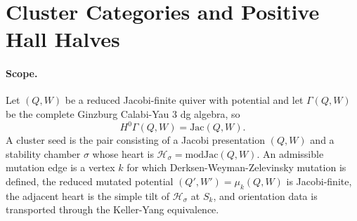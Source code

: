 
\providecommand{\Hom}{\mathrm{Hom}}
\providecommand{\End}{\mathrm{End}}
\providecommand{\Ext}{\mathrm{Ext}}
\providecommand{\per}{\mathrm{per}}
\providecommand{\CoHA}{\mathrm{CoHA}}
\providecommand{\Jac}{\mathrm{Jac}}
\providecommand{\Rep}{\mathrm{Rep}}
\providecommand{\mod}{\mathrm{mod}}
\providecommand{\fd}{\mathrm{fd}}
\providecommand{\sC}{\mathcal{C}}
\providecommand{\sD}{\mathcal{D}}
\providecommand{\sH}{\mathcal{H}}
\providecommand{\bC}{\mathbb{C}}
\providecommand{\bZ}{\mathbb{Z}}
\providecommand{\bP}{\mathbb{P}}
\providecommand{\Yplus}{Y^{+}}
\providecommand{\kch}{\kappa_{\mathrm{ch}}}
\providecommand{\kcat}{\kappa_{\mathrm{cat}}}
\providecommand{\chiHall}{\chi^{\mathrm{Hall}}}

\section*{Cluster Categories and Positive Hall Halves}
\label{sec:cluster-Yplus-gluing}

\paragraph{Scope.}
Let $(Q,W)$ be a reduced Jacobi-finite quiver with potential and let
$\Gamma(Q,W)$ be the complete Ginzburg Calabi-Yau $3$ dg algebra, so
\[
  H^0\Gamma(Q,W)=\Jac(Q,W).
\]
A cluster seed is the pair consisting of a Jacobi presentation
$(Q,W)$ and a stability chamber $\sigma$ whose heart is
$\sH_\sigma=\mod\Jac(Q,W)$.  An admissible mutation edge is a vertex
$k$ for which Derksen-Weyman-Zelevinsky mutation is defined, the reduced
mutated potential $(Q',W')=\mu_k(Q,W)$ is Jacobi-finite, the adjacent
heart is the simple tilt of $\sH_\sigma$ at $S_k$, and orientation data
is transported through the Keller-Yang equivalence.

